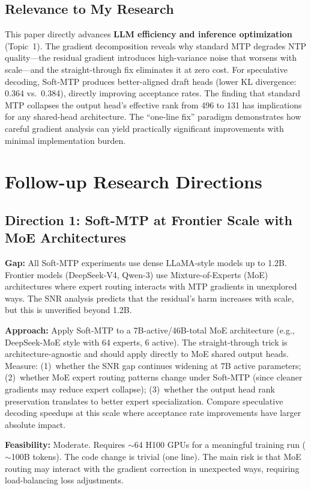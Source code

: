 \documentclass[11pt,a4paper]{article}
\begin{document}
\subsection{Relevance to My Research}
This paper directly advances \textbf{LLM efficiency and inference optimization} (Topic~1). The gradient decomposition reveals why standard MTP degrades NTP quality---the residual gradient introduces high-variance noise that worsens with scale---and the straight-through fix eliminates it at zero cost. For speculative decoding, Soft-MTP produces better-aligned draft heads (lower KL divergence: 0.364 vs.\ 0.384), directly improving acceptance rates. The finding that standard MTP collapses the output head's effective rank from 496 to 131 has implications for any shared-head architecture. The ``one-line fix'' paradigm demonstrates how careful gradient analysis can yield practically significant improvements with minimal implementation burden.

\section{Follow-up Research Directions}

\subsection{Direction 1: Soft-MTP at Frontier Scale with MoE Architectures}
\textbf{Gap:} All Soft-MTP experiments use dense LLaMA-style models up to 1.2B. Frontier models (DeepSeek-V4, Qwen-3) use Mixture-of-Experts (MoE) architectures where expert routing interacts with MTP gradients in unexplored ways. The SNR analysis predicts that the residual's harm increases with scale, but this is unverified beyond 1.2B.

\textbf{Approach:} Apply Soft-MTP to a 7B-active/46B-total MoE architecture (e.g., DeepSeek-MoE style with 64 experts, 6 active). The straight-through trick is architecture-agnostic and should apply directly to MoE shared output heads. Measure: (1)~whether the SNR gap continues widening at 7B active parameters; (2)~whether MoE expert routing patterns change under Soft-MTP (since cleaner gradients may reduce expert collapse); (3)~whether the output head rank preservation translates to better expert specialization. Compare speculative decoding speedups at this scale where acceptance rate improvements have larger absolute impact.

\textbf{Feasibility:} Moderate. Requires ${\sim}$64 H100 GPUs for a meaningful training run (${\sim}$100B tokens). The code change is trivial (one line). The main risk is that MoE routing may interact with the gradient correction in unexpected ways, requiring load-balancing loss adjustments.
\end{document}
